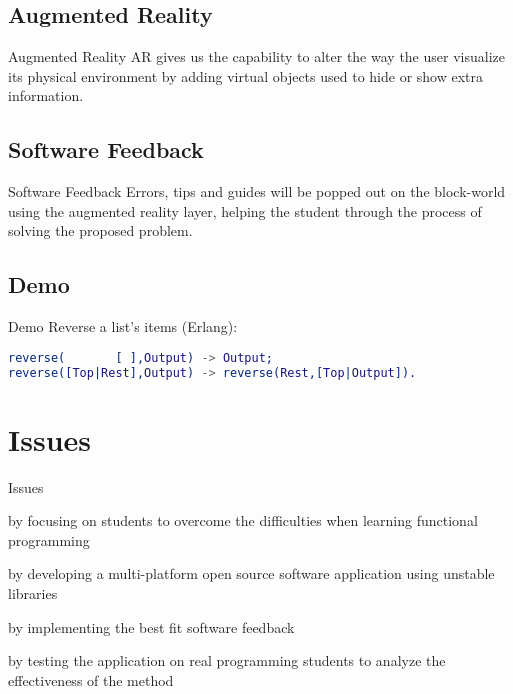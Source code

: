 \subsection {Augmented Reality}
\begin{frame} {Augmented Reality}
AR gives us the capability to alter the way the user visualize its physical
environment by adding virtual objects used to hide or show extra information.
\end{frame}

\subsection {Software Feedback}
\begin{frame} {Software Feedback}
Errors, tips and guides will be popped out on the block-world using the
augmented reality layer, helping the student through the process of solving the
proposed problem.
\end{frame}

\subsection {Demo}
\begin{frame}[fragile] {Demo}
Reverse a list's items (Erlang):
\begin{lstlisting}[language=erlang]
reverse(       [ ],Output) -> Output;
reverse([Top|Rest],Output) -> reverse(Rest,[Top|Output]).
\end{lstlisting}
\end{frame}




\section {Issues}

\begin{frame} {Issues}
\begin{description}
\pause \item [Conceptual] by focusing on students to overcome the difficulties
when learning functional programming
\pause \item [Technical] by developing a multi-platform open source software
application using unstable libraries
\pause \item [Interactive] by implementing the best fit software feedback
\pause \item [Practical] by testing the application on real programming students
to analyze the effectiveness of the method
\end{description}
\end{frame}



